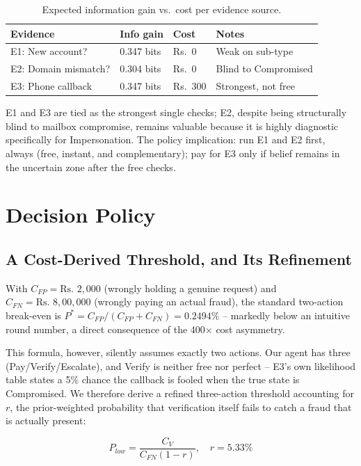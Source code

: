 \documentclass[10pt]{article}
\newcommand{\rs}{\textrm{Rs.\ }}
\begin{document}
\begin{table}[h]
\centering
\scriptsize
\begin{tabular}{@{}p{1.15in}p{0.5in}p{0.35in}p{0.75in}@{}}
\toprule
Evidence & Info gain & Cost & Notes \\
\midrule
E1: New account? & 0.347 bits & \rs 0 & Weak on sub-type \\
E2: Domain mismatch? & 0.304 bits & \rs 0 & Blind to Compromised \\
E3: Phone callback & 0.347 bits & \rs 300 & Strongest, not free \\
\bottomrule
\end{tabular}
\caption{Expected information gain vs.\ cost per evidence source.}
\label{tab:infogain}
\end{table}

E1 and E3 are tied as the strongest single checks; E2, despite being
structurally blind to mailbox compromise, remains valuable because it
is highly diagnostic specifically for Impersonation. The policy
implication: run E1 and E2 first, always (free, instant, and
complementary); pay for E3 only if belief remains in the uncertain
zone after the free checks.

\section{Decision Policy}
\label{sec:policy}

\subsection{A Cost-Derived Threshold, and Its Refinement}
With $C_{FP} = \rs 2{,}000$ (wrongly holding a genuine request) and
$C_{FN} = \rs 8{,}00{,}000$ (wrongly paying an actual fraud), the
standard two-action break-even is
$P^* = C_{FP}/(C_{FP}+C_{FN}) = 0.2494\%$ -- markedly below an
intuitive round number, a direct consequence of the 400$\times$ cost
asymmetry.

This formula, however, silently assumes exactly two actions. Our
agent has three (Pay/Verify/Escalate), and Verify is neither free nor
perfect -- E3's own likelihood table states a 5\% chance the callback
is fooled when the true state is Compromised. We therefore derive a
refined three-action threshold accounting for $r$, the
prior-weighted probability that verification itself fails to catch a
fraud that is actually present:

\begin{equation}
P_{low} = \frac{C_V}{C_{FN}(1-r)}, \quad r = 5.33\%
\end{equation}
\end{document}
